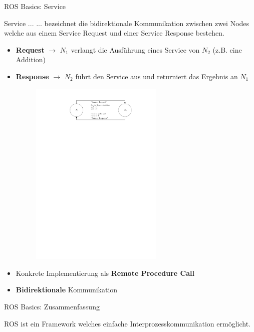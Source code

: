 \documentclass{beamer}
\begin{document}
\begin{frame}{ROS Basics: Service}
\begin{alertblock}{Service ...}
... bezeichnet die bidirektionale Kommunikation zwischen zwei Nodes welche aus einem Service Request und einer Service Response bestehen.
\end{alertblock}
\begin{itemize}
	\item \textbf{Request} $\rightarrow$ $N_1$ verlangt die Ausf\"uhrung eines Service von $N_2$ (z.B. eine Addition)
	\item \textbf{Response} $\rightarrow$ $N_2$ f\"uhrt den Service aus und returniert das Ergebnis an $N_1$
	\begin{figure}[H]
		\centering
		\includegraphics[width=0.6\textwidth]{./images/ros-service.pdf}
		\label{fig:ros_service}
	\end{figure}
	\item Konkrete Implementierung als \textbf{Remote Procedure Call}
	\item \textbf{Bidirektionale} Kommunikation
\end{itemize}
\end{frame}
\begin{frame}{ROS Basics: Zusammenfassung}
\begin{center}
\begin{huge}
ROS ist ein Framework welches einfache Interprozesskommunikation erm\"oglicht.
\end{huge}
\end{center}
\end{frame}
\end{document}
